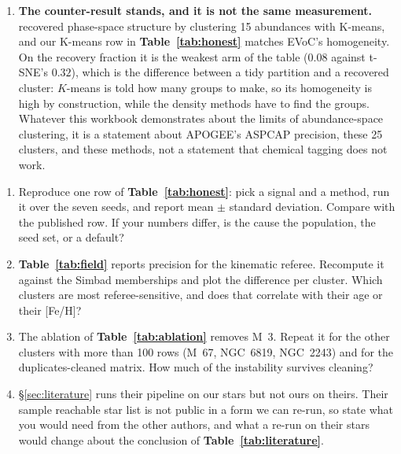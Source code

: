 \begin{enumerate}
  graph-attention autoencoder of \citet{Spina:25}, which works on
  $\sim\!47\,000$ APOGEE stars and deliberately adds kinematics and age to the
  chemistry, so any claim of state-of-the-art in this space should be read as
  unaudited.
\item \textbf{The counter-result stands, and it is not the same measurement.}
\citet{Hogg:16} recovered phase-space structure by clustering 15 abundances
with K-means, and our K-means row in \textbf{Table~\ref{tab:honest}} matches
EVoC's homogeneity. On the recovery fraction it is the weakest arm of the table
($0.08$ against t-SNE's $0.32$), which is the difference between a tidy
partition and a recovered cluster: $K$-means is told how many groups to make,
so its homogeneity is high by construction, while the density methods have to
find the groups. Whatever this workbook demonstrates about the limits of
abundance-space clustering, it is a statement about APOGEE's ASPCAP precision,
these 25 clusters, and these methods, not a statement that chemical tagging
does not work.
\end{enumerate}

\begin{issues}[EXERCISES]
\begin{enumerate}
\item Reproduce one row of \textbf{Table~\ref{tab:honest}}: pick a signal and
  a method, run it over the seven seeds, and report mean $\pm$ standard
  deviation. Compare with the published row. If your numbers differ, is the
  cause the population, the seed set, or a default?
\item \textbf{Table~\ref{tab:field}} reports precision for the kinematic
  referee. Recompute it against the Simbad memberships and plot the
  difference per cluster. Which clusters are most referee-sensitive, and does
  that correlate with their age or their [Fe/H]?
\item The ablation of \textbf{Table~\ref{tab:ablation}} removes M~3. Repeat
  it for the other clusters with more than 100 rows (M~67, NGC~6819, NGC~2243)
  and for the duplicates-cleaned matrix. How much of the instability survives
  cleaning?
\item \S\ref{sec:literature} runs their pipeline on our stars but not ours on
theirs. Their sample reachable star list is not public in a form we can re-run,
so state what you would need from the other authors, and what a re-run on their
stars would change about the conclusion of \textbf{Table~\ref{tab:literature}}.
\end{enumerate}
\end{issues}
